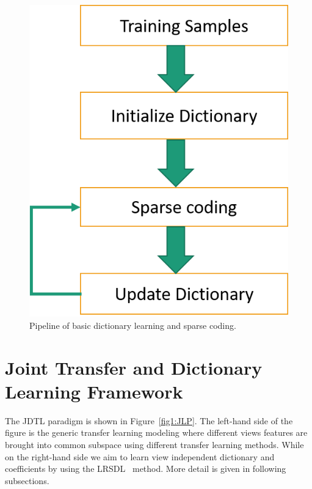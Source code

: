 \begin{figure}[!ht]
\centering
\includegraphics[width=.22\textheight]{figures/DLpipeline}
\linebreak
\caption{Pipeline of basic dictionary learning and sparse coding.}
\label{fig1:DLSC}
\end{figure}

\section{Joint Transfer and Dictionary Learning Framework}

The JDTL paradigm is shown in Figure~\ref{fig1:JLP}. The left-hand side of the figure is the generic transfer learning modeling where different views features are brought into common subspace using different transfer learning methods. While on the right-hand side we aim to learn view independent dictionary and coefficients by using the LRSDL~\cite{7987024} method. More detail is given in following subsections.

